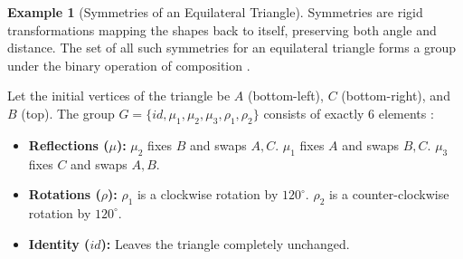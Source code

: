 \documentclass[11pt]{article}
\theoremstyle{definition}
\newtheorem{example}{Example}[section]
\theoremstyle{plain}
\theoremstyle{remark}
\begin{document}
\begin{example}[Symmetries of an Equilateral Triangle]
Symmetries are rigid transformations mapping the shapes back to itself, preserving both angle and distance. The set of all such symmetries for an equilateral triangle forms a group under the binary operation of composition \cite{gallian}. 

Let the initial vertices of the triangle be $A$ (bottom-left), $C$ (bottom-right), and $B$ (top). The group $G = \{id, \mu_1, \mu_2, \mu_3, \rho_1, \rho_2\}$ consists of exactly 6 elements \cite{dummit}:
\begin{itemize}
    \item \textbf{Reflections ($\mu$):} $\mu_2$ fixes $B$ and swaps $A, C$. $\mu_1$ fixes $A$ and swaps $B, C$. $\mu_3$ fixes $C$ and swaps $A, B$.
    \item \textbf{Rotations ($\rho$):} $\rho_1$ is a clockwise rotation by $120^\circ$. $\rho_2$ is a counter-clockwise rotation by $120^\circ$.
    \item \textbf{Identity ($id$):} Leaves the triangle completely unchanged.
\end{itemize}

\begin{figure}[h]
    \centering
    
    \begin{minipage}{0.48\textwidth}
        \centering
\end{minipage}
\end{figure}
\end{example}
\end{document}
